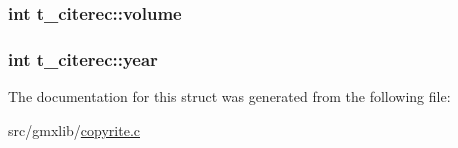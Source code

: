 \hypertarget{structt__citerec_affb76404551f2961bef4acccd011c334}{
\subsubsection[{volume}]{\setlength{\rightskip}{0pt plus 5cm}int {\bf t\-\_\-citerec\-::volume}}}\label{structt__citerec_affb76404551f2961bef4acccd011c334}
\hypertarget{structt__citerec_a45fccb932cdb8c3a35a4f2d2c42d74cc}{
\subsubsection[{year}]{\setlength{\rightskip}{0pt plus 5cm}int {\bf t\-\_\-citerec\-::year}}}\label{structt__citerec_a45fccb932cdb8c3a35a4f2d2c42d74cc}


\-The documentation for this struct was generated from the following file\-:\begin{DoxyCompactItemize}
\item 
src/gmxlib/\hyperlink{copyrite_8c}{copyrite.\-c}\end{DoxyCompactItemize}
